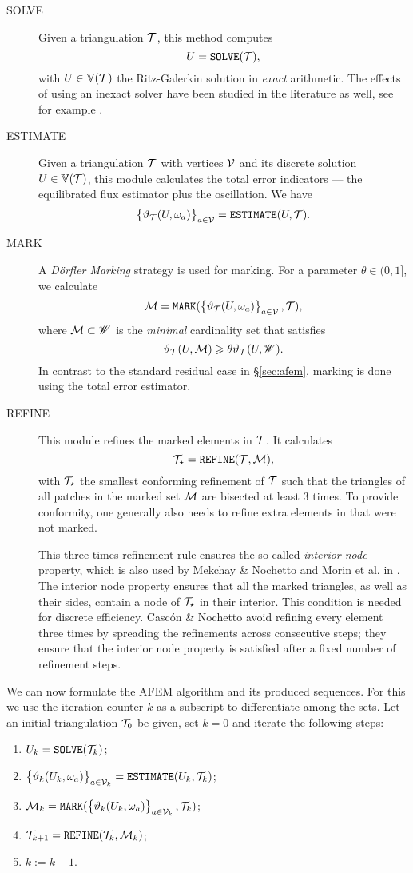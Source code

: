 \documentclass[thesis.tex]{subfiles}
\begin{document}
\begin{description}
  \item[SOLVE]
Given a triangulation $\mathcal{T}$, this method computes
\[
  U = \texttt{SOLVE}(\mathcal{T}),
\]
with $U \in \mathbb{V}(\mathcal{T})$ the  Ritz-Galerkin solution in \emph{exact} arithmetic. The effects of using an inexact solver have
been studied in the literature as well, see for example \cite{carstensen2014axioms}.
\item[ESTIMATE]
  Given a triangulation $\mathcal{T}$ with vertices $\mathcal{V}$ and its discrete solution $U \in \mathbb{V}(\mathcal{T})$, this module 
calculates the total error indicators --- the equilibrated flux estimator plus the oscillation. We have
\[
  \set{\vartheta_{\mathcal{T}}(U, \omega_a)}_{a \in \mathcal{V}} = \texttt{ESTIMATE}(U, \mathcal{T}).
\]
\item[MARK]
A \emph{D\"orfler Marking} strategy \cite{dorfler1996convergent} is used for marking. For a parameter $\theta \in (0,1]$, we calculate
\[
  \mathcal{M} = \texttt{MARK}( \set{\vartheta_{\mathcal{T}}(U, \omega_a)}_{a \in \mathcal{V}}, \mathcal{T}),
\]
where $\mathcal{M} \subset \mathscr{W}$ is the \emph{minimal} cardinality set that satisfies
\[
  \vartheta_{\mathcal{T}}(U,\mathcal{M}) \geqslant \theta \vartheta_{\mathcal{T}}(U, \mathscr{W}).
\]
In contrast to the standard residual case in \S\ref{sec:afem}, marking is done using the total error estimator.
\item[REFINE]
This module refines the marked elements in $\mathcal{T}$. It calculates
\[
  \mathcal{T}_\star = \texttt{REFINE}(\mathcal{T}, \mathcal{M}),
\]
with $\mathcal{T}_\star$ the smallest conforming refinement of $\mathcal{T}$ such that the triangles of
all patches in the marked set $\mathcal{M}$ are bisected at least 3 times. 
To provide conformity, one generally also needs to refine extra elements in that were not marked.

This three times refinement rule ensures the so-called \emph{interior node} property,
which is also used by Mekchay \& Nochetto \cite{mekchay2005convergence} and Morin et al. in \cite{morin2002convergence}.
The interior node property ensures that all the marked triangles, as well as their sides, contain a node of $\mathcal{T}_\star$ in their interior.
This condition is needed for  discrete efficiency. Casc\'on \& Nochetto \cite{cascon2012} avoid
refining every element three times by  spreading the refinements across consecutive steps;
they ensure that the interior node property is satisfied after a fixed number of refinement steps.
\end{description}

We can now formulate the AFEM algorithm and its produced sequences. For this we use the
iteration counter $k$ as a subscript to differentiate among the sets.
Let an initial triangulation $\mathcal{T}_0$ be given, set $k = 0$ and iterate the following steps:
\begin{enumerate}
\item $U_k = \texttt{SOLVE}(\mathcal{T}_k)$;
\item $\set{\vartheta_k(U_k, \omega_a)}_{a \in \mathcal{V}_k} = \texttt{ESTIMATE}(U_k, \mathcal{T}_k)$;
  \item $\mathcal{M}_k = \texttt{MARK}(\set{\vartheta_k(U_k, \omega_a)}_{a \in \mathcal{V}_k}, \mathcal{T}_k)$;
  \item $\mathcal{T}_{k+1} = \texttt{REFINE}(\mathcal{T}_k, \mathcal{M}_k)$;
  \item $k  := k + 1$.
\end{enumerate}
\end{document}
